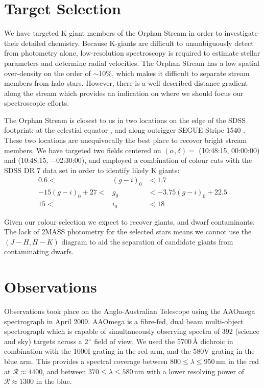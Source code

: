 \documentclass[10pt,apjl]{emulateapj}
\begin{document}
\section{Target Selection}
\label{sec:target-selection}

We have targeted K giant members of the Orphan Stream in order to investigate their detailed chemistry. Because K-giants are difficult to unambiguously detect from photometry alone, low-resolution spectroscopy is required to estimate stellar parameters and determine radial velocities. The Orphan Stream has a low spatial over-density on the order of $\sim$10\%, which makes it difficult to separate stream members from halo stars. However, there is a well described distance gradient along the stream \citep{Belokurov_et-al_2007, Newberg_et-al_2010} which provides an indication on where we should focus our spectroscopic efforts.

The Orphan Stream is closest to us in two locations on the edge of the SDSS footprint: at the celestial equator \citep{Belokurov_et-al_2007}, and along outrigger SEGUE Stripe 1540 \citep{Newberg_et-al_2010}. These two locations are unequivocally the best place to recover bright stream members. We have targeted two fields centered on $(\alpha, \delta) =$ (10:48:15, 00:00:00) and (10:48:15, $-$02:30:00), and employed a combination of colour cuts with the SDSS DR 7 \citep{Abazajian_et-al_2009} data set in order to identify likely K giants:
\begin{eqnarray}
0.6 <& (g-i)_0 &< 1.7 \\
-15(g-i)_0 + 27 <& g_0 &< -3.75(g-i)_0 + 22.5 \\
15  <& i_0  &< 18 
\end{eqnarray}

Given our colour selection we expect to recover giants, and dwarf contaminants. The lack of 2MASS photometry for the selected stars means we cannot use the $(J-H, H-K)$ diagram to aid the separation of candidate giants from contaminating dwarfs.

\section{Observations}
\label{sec:observations}

Observations took place on the Anglo-Australian Telescope using the AAOmega spectrograph in April 2009. AAOmega is a fibre-fed, dual beam multi-object spectrograph which is capable of simultaneously observing spectra of 392 (science and sky) targets across a $2\,^\circ$ field of view. We used the 5700\,{\AA} dichroic in combination with the 1000I grating in the red arm, and the 580V grating in the blue arm. This provides a spectral coverage between $800 \leq \lambda \leq 950$\,nm in the red at $\mathcal{R} \approx 4400$, and between $370 \leq \lambda \leq 580$\,nm with a lower resolving power of $\mathcal{R} \approx 1300$ in the blue.
\end{document}
